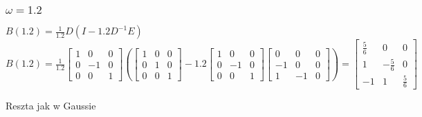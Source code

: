 \documentclass{article}
\begin{document}
\subsubsection{$\omega=1.2$}
$B(1.2)=\frac{1}{1.2}D(I-1.2D^{-1}E)$\\
$B(1.2)=\frac{1}{1.2}\begin{bmatrix} 1 & 0 & 0 \\ 0 & -1 & 0 \\ 0 & 0 & 1 \end{bmatrix}(\begin{bmatrix} 1 & 0 & 0 \\ 0 & 1 & 0 \\ 0 & 0 & 1 \end{bmatrix}-1.2\begin{bmatrix} 1 & 0 & 0 \\ 0 & -1 & 0 \\ 0 & 0 & 1 \end{bmatrix}\begin{bmatrix} 0 & 0 & 0 \\ -1 & 0 & 0 \\ 1 & -1 & 0 \end{bmatrix})=\begin{bmatrix} \frac{5}{6} & 0 & 0 \\ 1 & -\frac{5}{6} & 0 \\ -1 & 1 & \frac{5}{6} \end{bmatrix}$

Reszta jak w Gaussie

\end{document}
